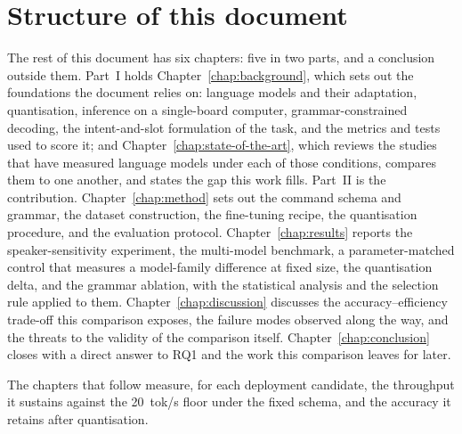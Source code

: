 \section{Structure of this document}
The rest of this document has six chapters: five in two parts, and a conclusion outside
them. Part~I holds Chapter~\ref{chap:background}, which sets out the foundations the document
relies on: language models and their adaptation, quantisation, inference on a single-board
computer, grammar-constrained decoding, the intent-and-slot formulation of the task, and the
metrics and tests used to score it; and Chapter~\ref{chap:state-of-the-art}, which reviews the
studies that have measured language models under each of those conditions, compares them to one
another, and states the gap this work fills. Part~II is the contribution. Chapter~\ref{chap:method}
sets out the command schema and grammar, the dataset construction, the fine-tuning recipe, the
quantisation procedure, and the evaluation protocol. Chapter~\ref{chap:results} reports the
speaker-sensitivity experiment, the multi-model benchmark, a parameter-matched control that
measures a model-family difference at fixed size, the quantisation delta, and the grammar ablation, with
the statistical analysis and the selection rule applied to them. Chapter~\ref{chap:discussion}
discusses the accuracy--efficiency trade-off this comparison exposes, the failure modes observed
along the way, and the threats to the validity of the comparison itself.
Chapter~\ref{chap:conclusion} closes with a direct answer to RQ1 and the work this comparison
leaves for later.

The chapters that follow measure, for each deployment candidate, the throughput it sustains
against the 20~tok/s floor under the fixed schema, and the accuracy it retains after quantisation.
